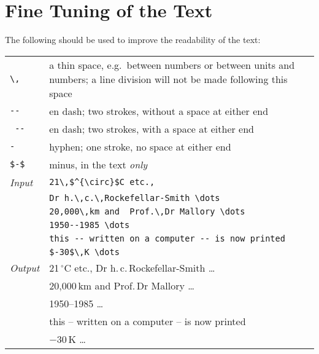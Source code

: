 \section{Fine Tuning of the Text}
%
The following should be used to improve the readability of the text:
\begin{flushleft}
\begin{tabular}{@{}p{}p{}}
\verb|\,|   & a thin space, e.g.\ between numbers or between units
              and num\-bers; a line division will not be made
              following this space\\
\verb|--|   & en dash; two strokes, without a space at either end\\
\verb*| -- |& en dash; two strokes, with  a space at either end\\
\verb|-|    & hyphen; one stroke, no space at either end\\
\verb|$-$|  & minus, in the text {\em only} \\[8mm]
{\em Input} & \verb|21\,$^{\circ}$C etc.,|\\
            &  \verb|Dr h.\,c.\,Rockefellar-Smith \dots|\\
            & \verb|20,000\,km and  Prof.\,Dr Mallory \dots|\\
            & \verb|1950--1985 \dots|\\
            & \verb|this -- written on a computer -- is now printed|\\
            & \verb|$-30$\,K \dots|\\[3mm]
{\em Output}& 21\,$^{\circ}$C etc., Dr h.\,c.\,Rockefellar-Smith \dots\\
            & 20,000\,km and  Prof.\,Dr Mallory \dots\\
            & 1950--1985 \dots\\
            & this -- written on a computer -- is now printed\\
            & $-30$\,K \dots
\end{tabular}
\end{flushleft}
%
